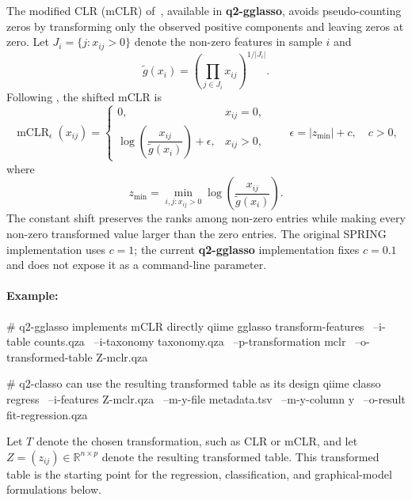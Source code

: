 \documentclass[11pt,a4paper]{article}
\newcommand{\pkg}[1]{\textbf{#1}}
\newcommand{\R}{\mathbb{R}}
\newcommand{\mCLR}{\operatorname{mCLR}}
\begin{document}
The modified CLR (mCLR) of~\citet{yoon2019microbial}, available in
\pkg{q2-gglasso}, avoids pseudo-counting zeros by transforming only the observed
positive components and leaving zeros at zero. Let $J_i=\{j:x_{ij}>0\}$ denote
the non-zero features in sample $i$ and
\begin{equation}
\label{eq:positive-geometric-mean}
\widetilde{g}(x_i) =
\left(\prod_{j \in J_i} x_{ij}\right)^{1/|J_i|}.
\end{equation}
Following \citet{yoon2019microbial}, the shifted mCLR is
\begin{equation}
\label{eq:mclr}
\mCLR_{\epsilon}(x_{ij}) =
\begin{cases}
0, & x_{ij}=0,\\[4pt]
\log\left(\dfrac{x_{ij}}{\widetilde{g}(x_i)}\right)+\epsilon,
& x_{ij}>0,
\end{cases}
\qquad
\epsilon = |z_{\min}| + c,\quad c>0,
\end{equation}
where
\begin{equation}
\label{eq:mclr-shift}
z_{\min} =
\min_{i,j:x_{ij}>0}
\log\left(\frac{x_{ij}}{\widetilde{g}(x_i)}\right).
\end{equation}
The constant shift preserves the ranks among non-zero entries while making every
non-zero transformed value larger than the zero entries. The original SPRING
implementation uses $c=1$; the current \pkg{q2-gglasso} implementation fixes
$c=0.1$ and does not expose it as a command-line parameter.

\paragraph{Example:} \mbox{}
\begin{PseudoCode}
# q2-gglasso implements mCLR directly
qiime gglasso transform-features \
    --i-table counts.qza \
    --i-taxonomy taxonomy.qza \
    --p-transformation mclr \
    --o-transformed-table Z-mclr.qza

# q2-classo can use the resulting transformed table as its design
qiime classo regress \
    --i-features Z-mclr.qza \
    --m-y-file metadata.tsv \
    --m-y-column y \
    --o-result fit-regression.qza
\end{PseudoCode}

\par Let $T$ denote the chosen transformation, such as CLR or mCLR, and let
$Z=(z_{ij})\in\R^{n\times p}$ denote the resulting transformed table.
This transformed table is the starting point for the regression,
classification, and graphical-model formulations below.
\end{document}
